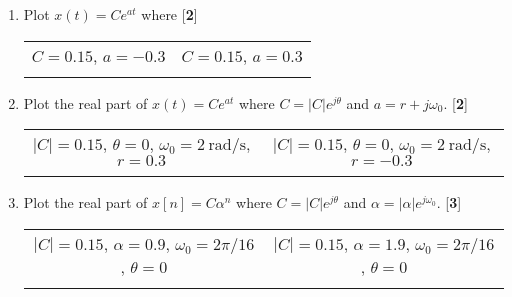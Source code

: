 \documentclass[10pt]{article}
\newcommand{\mks}[1]{\hfill
[\textbf{\small {#1}}]
}
\begin{document}
\begin{enumerate}[leftmargin=*]
    \item Plot
    $
        x(t) = Ce^{at}
    $
    where \mks{2}

  \noindent  \begin{tabular}{cc}
        $C=0.15$, $a= -0.3$ & $C=0.15$, $a= 0.3$ \\
         &  \\
    \end{tabular}








\item Plot the real part of
    $
        x(t) = Ce^{at}
    $
    where
    $
        C = |C|e^{j\theta}
    $
    and
    $
        a = r + j\omega_0
    $.
    \mks{2}

  \noindent  \begin{tabular}{cc}
        $|C| = 0.15$, $\theta = 0$, $\omega_0 = 2\:\mathrm{rad/s}$, $r = 0.3$  & $|C| = 0.15$, $\theta = 0$, $\omega_0 = 2\:\mathrm{rad/s}$, $r = -0.3$\\
         &  \\
    \end{tabular}


\item Plot the real part of
    $
        x[n] = C\alpha^n
    $
    where
    $
        C = |C|e^{j\theta}
    $
    and
    $
        \alpha = |\alpha|e^{j\omega_0}
    $.
    \mks{3}

  \noindent  \begin{tabular}{cc}
        $|C| = 0.15$, $\alpha = 0.9$, $\omega_0 = 2\pi/16$, $\theta = 0$  & $|C| = 0.15$, $\alpha = 1.9$, $\omega_0 = 2\pi/16$, $\theta = 0$  \\
         &  \\
    \end{tabular}







\end{enumerate}
\end{document}
